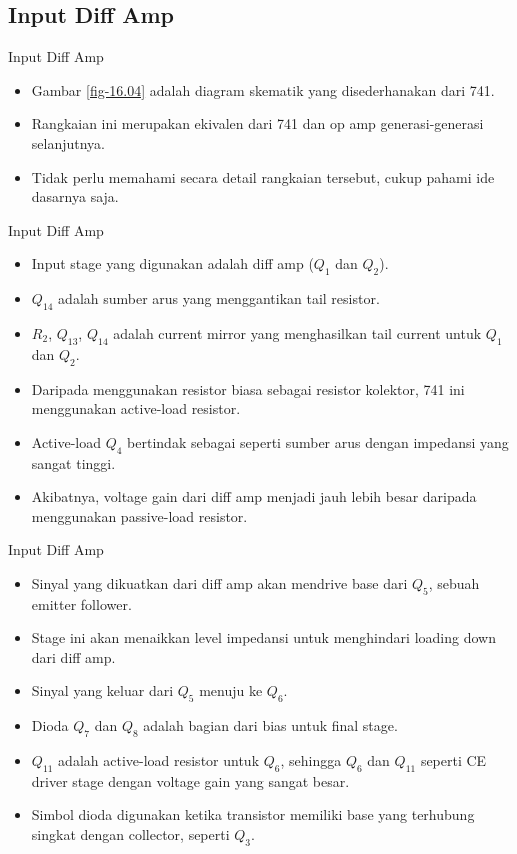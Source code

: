 \subsection{Input Diff Amp}

\begin{frame}{Input Diff Amp}
	\begin{itemize}
		\item Gambar \ref{fig-16.04} adalah diagram skematik yang disederhanakan dari 741.
		\item Rangkaian ini merupakan ekivalen dari 741 dan op amp generasi-generasi selanjutnya.
		\item Tidak perlu memahami secara detail rangkaian tersebut, cukup pahami ide dasarnya saja.
	\end{itemize}
\end{frame}

\begin{frame}{Input Diff Amp}
	\begin{itemize}
		\item Input stage yang digunakan adalah diff amp ($ Q_1 $ dan $ Q_2 $).
		\item $ Q_{14} $ adalah sumber arus yang menggantikan tail resistor.
		\item $ R_2 $, $ Q_{13} $, $ Q_{14} $ adalah current mirror yang menghasilkan tail current untuk $ Q_1 $ dan $ Q_2 $.
		\item Daripada menggunakan resistor biasa sebagai resistor kolektor, 741 ini menggunakan active-load resistor.
		\item Active-load $ Q_4 $ bertindak sebagai seperti sumber arus dengan impedansi yang sangat tinggi.
		\item Akibatnya, voltage gain dari diff amp menjadi jauh lebih besar daripada menggunakan passive-load resistor.
	\end{itemize}
\end{frame}

\begin{frame}{Input Diff Amp}
	\begin{itemize}
		\item Sinyal yang dikuatkan dari diff amp akan mendrive base dari $ Q_5 $, sebuah emitter follower.
		\item Stage ini akan menaikkan level impedansi untuk menghindari loading down dari diff amp.
		\item Sinyal yang keluar dari $ Q_5 $ menuju ke $ Q_6 $.
		\item Dioda $ Q_7 $ dan $ Q_8 $ adalah bagian dari bias untuk final stage.
		\item $ Q_{11} $ adalah active-load resistor untuk $ Q_6 $, sehingga $ Q_6 $ dan $ Q_{11} $ seperti CE driver stage dengan voltage gain yang sangat besar.
		\item Simbol dioda digunakan ketika transistor memiliki base yang terhubung singkat dengan collector, seperti $ Q_3 $.
	\end{itemize}
\end{frame}

